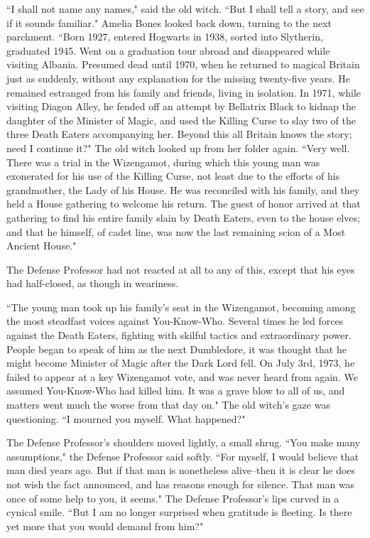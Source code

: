 ``I shall not name any names," said the old witch. ``But I shall tell a story, and see if it sounds familiar." Amelia Bones looked back down, turning to the next parchment. ``Born 1927, entered Hogwarts in 1938, sorted into Slytherin, graduated 1945. Went on a graduation tour abroad and disappeared while visiting Albania. Presumed dead until 1970, when he returned to magical Britain just as suddenly, without any explanation for the missing twenty-five years. He remained estranged from his family and friends, living in isolation. In 1971, while visiting Diagon Alley, he fended off an attempt by Bellatrix Black to kidnap the daughter of the Minister of Magic, and used the Killing Curse to slay two of the three Death Eaters accompanying her. Beyond this all Britain knows the story; need I continue it?" The old witch looked up from her folder again. ``Very well. There was a trial in the Wizengamot, during which this young man was exonerated for his use of the Killing Curse, not least due to the efforts of his grandmother, the Lady of his House. He was reconciled with his family, and they held a House gathering to welcome his return. The guest of honor arrived at that gathering to find his entire family slain by Death Eaters, even to the house elves; and that he himself, of cadet line, was now the last remaining scion of a Most Ancient House."

The Defense Professor had not reacted at all to any of this, except that his eyes had half-closed, as though in weariness.

``The young man took up his family's seat in the Wizengamot, becoming among the most steadfast voices against You-Know-Who. Several times he led forces against the Death Eaters, fighting with skilful tactics and extraordinary power. People began to speak of him as the next Dumbledore, it was thought that he might become Minister of Magic after the Dark Lord fell. On July 3rd, 1973, he failed to appear at a key Wizengamot vote, and was never heard from again. We assumed You-Know-Who had killed him. It was a grave blow to all of us, and matters went much the worse from that day on." The old witch's gaze was questioning. ``I mourned you myself. What happened?"

The Defense Professor's shoulders moved lightly, a small shrug. ``You make many assumptions," the Defense Professor said softly. ``For myself, I would believe that man died years ago. But if that man is nonetheless alive\---then it is clear he does not wish the fact announced, and has reasons enough for silence. That man was once of some help to you, it seems." The Defense Professor's lips curved in a cynical smile. ``But I am no longer surprised when gratitude is fleeting. Is there yet more that you would demand from him?"

